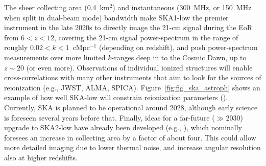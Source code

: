 The sheer collecting area (0.4~km$^2$) and instantaneous (300~MHz, or 150~MHz when split in dual-beam mode) bandwidth make SKA1-low the premier instrument in the late 2020s to directly image the 21-cm signal during the EoR from $6 < z < 12$, covering the 21-cm signal power-spectrum in the range of roughly $ 0.02 < k < 1 $~cMpc$^{-1}$ (depending on redshift), and push power-spectrum measurements over more limited $k$-ranges deep in to the Cosmic Dawn, up to $z \sim 20$ (or even more). 
Observations of individual ionized structures will enable cross-correlations with many other instruments that aim to look for the sources of reionization (e.g., JWST, ALMA, SPICA). Figure~\ref{fig:fig_ska_astroph} shows an example of how well SKA-low will constrain reionization parameters (\cite{greig19}). Currently, SKA is planned to be operational around 2028, although early science is foreseen several years before that.
%
Finally, ideas for a far-future ($\gg 2030$) upgrade to SKA2-low have already been developed (e.g., \cite{koopmans15}), which nominally foresees an increase in collecting area by a factor of about four. This could allow more detailed imaging due to lower thermal noise, and increase angular resolution also at higher redshifts.



